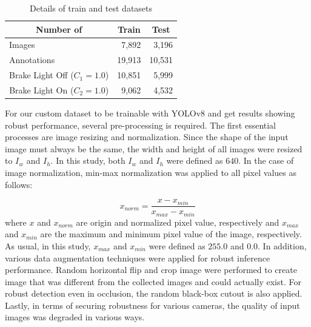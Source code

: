\begin{table}[h]
    \caption{Details of train and test datasets}
    \label{tab:dataset}
    \begin{tabular}{p{5cm} p{5cm} p{5cm}}
    \toprule
    \multicolumn{1}{c}{Number of}                          & \multicolumn{1}{c}{Train} & \multicolumn{1}{c}{Test} \\
    \midrule
    Images                              & \multicolumn{1}{r}{7,892}                     & \multicolumn{1}{r}{3,196}                    \\
    Annotations                         & \multicolumn{1}{r}{19,913}                    & \multicolumn{1}{r}{10,531}                   \\
    \multicolumn{1}{c}{Brake Light Off ($C_{1}=1.0$)} & \multicolumn{1}{r}{10,851}                    & \multicolumn{1}{r}{5,999}                    \\
    \multicolumn{1}{c}{Brake Light On ($C_{2}=1.0$)}  & \multicolumn{1}{r}{9,062}                     & \multicolumn{1}{r}{4,532}                   \\
    \bottomrule
    \end{tabular}%
\end{table}



For our custom dataset to be trainable with YOLOv8 and get results showing robust performance, several pre-processing is required.
The first essential processes are image resizing and normalization.
Since the shape of the input image must always be the same, the width and height of all images were resized to $I_{w}$ and $I_{h}$. In this study, both $I_{w}$ and $I_{h}$ were defined as $640$. 
In the case of image normalization, min-max normalization was applied to all pixel values as follows:

\begin{equation}
    x_{norm} = \frac{x - x_{min}}{x_{max} - x_{min}}
\end{equation}
where $x$ and $x_{norm}$ are origin and normalized pixel value, respectively and $x_{max}$ and $x_{min}$ are the maximum and minimum pixel value of the image, respectively.
As usual, in this study, $x_{max}$ and $x_{min}$ were defined as $255.0$ and $0.0$.
In addition, various data augmentation techniques were applied for robust inference performance.
Random horizontal flip and crop image were performed to create image that was different from the collected images and could actually exist.
For robust detection even in occlusion, the random black-box cutout is also applied.
Lastly, in terms of securing robustness for various cameras, the quality of input images was degraded in various ways.


